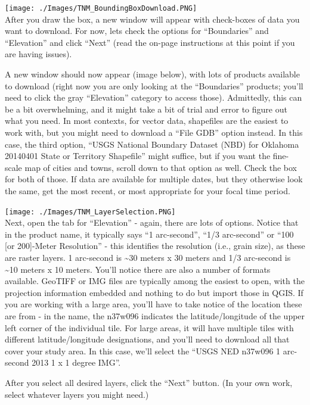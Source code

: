 \documentclass[12pt,]{article}
\begin{document}
\texttt{[image: ./Images/TNM\_BoundingBoxDownload.PNG]}\\ After you draw
the box, a new window will appear with check-boxes of data you want to
download. For now, lets check the options for ``Boundaries'' and
``Elevation'' and click ``Next'' (read the on-page instructions at this
point if you are having issues).

A new window should now appear (image below), with lots of products
available to download (right now you are only looking at the
``Boundaries'' products; you'll need to click the gray ``Elevation''
category to access those). Admittedly, this can be a bit overwhelming,
and it might take a bit of trial and error to figure out what you need.
In most contexts, for vector data, shapefiles are the easiest to work
with, but you might need to download a ``File GDB'' option instead. In
this case, the third option, ``USGS National Boundary Dataset (NBD) for
Oklahoma 20140401 State or Territory Shapefile'' might suffice, but if
you want the fine-scale map of cities and towns, scroll down to that
option as well. Check the box for both of those. If data are available
for multiple dates, but they otherwise look the same, get the most
recent, or most appropriate for your focal time period.

\texttt{[image: ./Images/TNM\_LayerSelection.PNG]}\\ Next, open the tab
for ``Elevation'' - again, there are lots of options. Notice that in the
product name, it typically says ``1 arc-second'', ``1/3 arc-second'' or
``100 {[}or 200{]}-Meter Resolution'' - this identifies the resolution
(i.e., grain size), as these are raster layers. 1 arc-second is
\textasciitilde{}30 meters x 30 meters and 1/3 arc-second is
\textasciitilde{}10 meters x 10 meters. You'll notice there are also a
number of formats available. GeoTIFF or IMG files are typically among
the easiest to open, with the projection information embedded and
nothing to do but import those in QGIS. If you are working with a large
area, you'll have to take notice of the location these are from - in the
name, the n37w096 indicates the latitude/longitude of the upper left
corner of the individual tile. For large areas, it will have multiple
tiles with different latitude/longitude designations, and you'll need to
download all that cover your study area. In this case, we'll select the
``USGS NED n37w096 1 arc-second 2013 1 x 1 degree IMG''.

After you select all desired layers, click the ``Next'' button. (In your
own work, select whatever layers you might need.)
\end{document}
